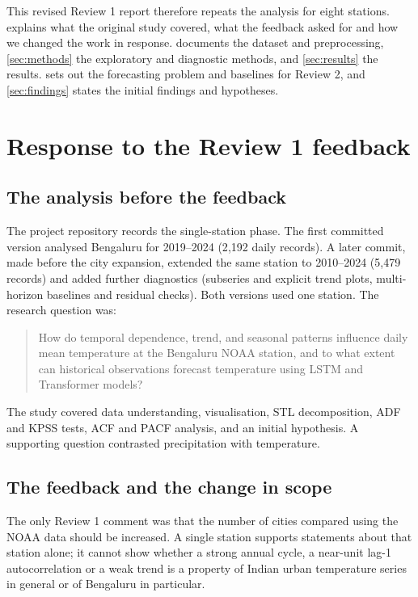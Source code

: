 \documentclass[11pt,a4paper]{article}
\begin{document}
This revised Review 1 report therefore repeats the analysis for eight stations.  explains what the original study covered, what the feedback asked for and how we changed the work in response.  documents the dataset and preprocessing, \cref{sec:methods} the exploratory and diagnostic methods, and \cref{sec:results} the results.  sets out the forecasting problem and baselines for Review 2, and \cref{sec:findings} states the initial findings and hypotheses.

\section{Response to the Review 1 feedback}
\label{sec:feedback}

\subsection{The analysis before the feedback}

The project repository records the single-station phase. The first committed version analysed Bengaluru for 2019--2024 (2{,}192 daily records). A later commit, made before the city expansion, extended the same station to 2010--2024 (5{,}479 records) and added further diagnostics (subseries and explicit trend plots, multi-horizon baselines and residual checks). Both versions used one station. The research question was:
\begin{quote}\small
How do temporal dependence, trend, and seasonal patterns influence daily mean temperature at the Bengaluru NOAA station, and to what extent can historical observations forecast temperature using LSTM and Transformer models?
\end{quote}
The study covered data understanding, visualisation, STL decomposition, ADF and KPSS tests, ACF and PACF analysis, and an initial hypothesis. A supporting question contrasted precipitation with temperature.

\subsection{The feedback and the change in scope}

The only Review 1 comment was that the number of cities compared using the NOAA data should be increased. A single station supports statements about that station alone; it cannot show whether a strong annual cycle, a near-unit lag-1 autocorrelation or a weak trend is a property of Indian urban temperature series in general or of Bengaluru in particular.
\end{document}
